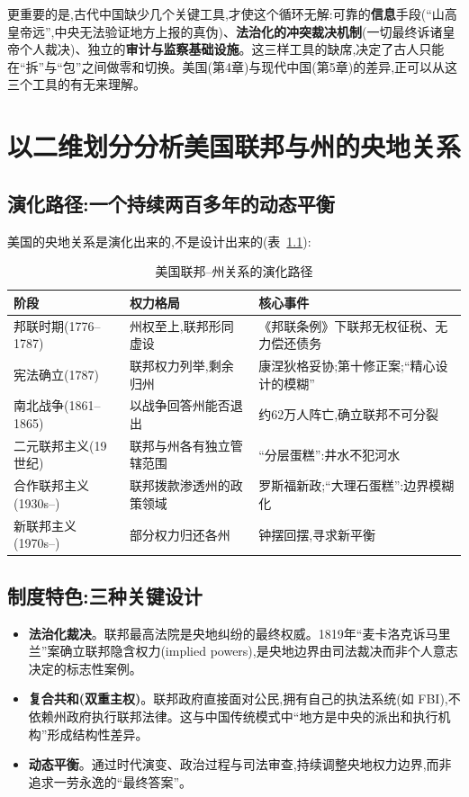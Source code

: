 \documentclass[UTF8,12pt,a4paper]{ctexrep}
\begin{document}
更重要的是,古代中国缺少几个关键工具,才使这个循环无解:可靠的\textbf{信息}手段(``山高皇帝远'',中央无法验证地方上报的真伪)、\textbf{法治化的冲突裁决机制}(一切最终诉诸皇帝个人裁决)、独立的\textbf{审计与监察基础设施}。这三样工具的缺席,决定了古人只能在``拆''与``包''之间做零和切换。美国(第4章)与现代中国(第5章)的差异,正可以从这三个工具的有无来理解。

\chapter{以二维划分分析美国联邦与州的央地关系}

\section{演化路径:一个持续两百多年的动态平衡}

美国的央地关系是演化出来的,不是设计出来的(表~\ref{tab:us-path}):

\begin{table}[htbp]
  \centering
  \small
  \caption{美国联邦--州关系的演化路径}
  \label{tab:us-path}
  \begin{tabularx}{\linewidth}{@{}lXX@{}}
    \toprule
    \textbf{阶段} & \textbf{权力格局} & \textbf{核心事件} \\
    \midrule
    邦联时期(1776--1787) & 州权至上,联邦形同虚设 & 《邦联条例》下联邦无权征税、无力偿还债务 \\
    宪法确立(1787) & 联邦权力列举,剩余归州 & 康涅狄格妥协;第十修正案;``精心设计的模糊'' \\
    南北战争(1861--1865) & 以战争回答州能否退出 & 约62万人阵亡,确立联邦不可分裂 \\
    二元联邦主义(19世纪) & 联邦与州各有独立管辖范围 & ``分层蛋糕'':井水不犯河水 \\
    合作联邦主义(1930s--) & 联邦拨款渗透州的政策领域 & 罗斯福新政;``大理石蛋糕'':边界模糊化 \\
    新联邦主义(1970s--) & 部分权力归还各州 & 钟摆回摆,寻求新平衡 \\
    \bottomrule
  \end{tabularx}
\end{table}

\section{制度特色:三种关键设计}

\begin{itemize}
  \item \textbf{法治化裁决}。联邦最高法院是央地纠纷的最终权威。1819年``麦卡洛克诉马里兰''案确立联邦隐含权力(implied powers),是央地边界由司法裁决而非个人意志决定的标志性案例。
  \item \textbf{复合共和(双重主权)}。联邦政府直接面对公民,拥有自己的执法系统(如 FBI),不依赖州政府执行联邦法律。这与中国传统模式中``地方是中央的派出和执行机构''形成结构性差异。
  \item \textbf{动态平衡}。通过时代演变、政治过程与司法审查,持续调整央地权力边界,而非追求一劳永逸的``最终答案''。
\end{itemize}
\end{document}
